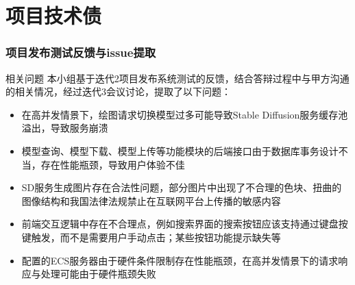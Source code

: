 %
%
%
%
\section{项目技术债}
    \begin{frame}
    \frametitle{项目发布测试反馈与issue提取}
        \footnotesize
        \begin{block}{相关问题}
            本小组基于迭代2项目发布系统测试的反馈，结合答辩过程中与甲方沟通的相关情况，经过迭代3会议讨论，提取了以下问题：
            \begin{itemize}
                \item 在高并发情景下，绘图请求切换模型过多可能导致Stable Diffusion服务缓存池溢出，导致服务崩溃
                \item 模型查询、模型下载、模型上传等功能模块的后端接口由于数据库事务设计不当，存在性能瓶颈，导致用户体验不佳
                \item SD服务生成图片存在合法性问题，部分图片中出现了不合理的色块、扭曲的图像结构和我国法律法规禁止在互联网平台上传播的敏感内容
                \item 前端交互逻辑中存在不合理点，例如搜索界面的搜索按钮应该支持通过键盘按键触发，而不是需要用户手动点击；某些按钮功能提示缺失等
                \item 配置的ECS服务器由于硬件条件限制存在性能瓶颈，在高并发情景下的请求响应与处理可能由于硬件瓶颈失败
            \end{itemize}
        \end{block}
    \end{frame}


